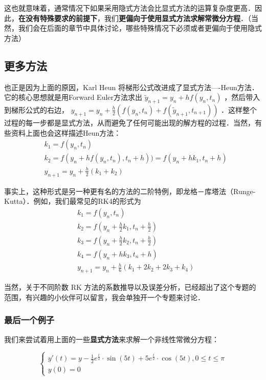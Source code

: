 这也就意味着，通常情况下如果采用隐式方法会比显式方法的运算复杂度更高．因此，\textbf{在没有特殊要求的前提下}，我们\textbf{更偏向于使用显式方法求解常微分方程}．（当然，我们会在后面的章节中具体讨论，哪些特殊情况下必须或者更偏向于使用隐式方法）

\subsection{更多方法}

也正是因为上面的原因，Karl Heun 将梯形公式改进成了显式方法----Heun方法．它的核心思想就是用Forward Euler方法求出  $\tilde{y}_{n+1}=y_n+hf(y_n,t_n)$ ，然后带入到梯形公式的右边，  $y_{n+1}=y_n+\frac{h}{2}\left(f(y_n,t_n)+f(\tilde{y}_{n+1},t_{n+1}) \right)$ ．这样整个过程的每一步都是显式方法，从而避免了任何可能出现的解方程的过程．当然，有些资料上面也会这样描述Heun方法：
\begin{equation}
\begin{aligned}
&k_1=f(y_n,t_n)\\
&k_2=f(y_n+hf(y_n,t_n),t_n+h))=f(y_n+hk_1,t_n+h)\\
&y_{n+1}=y_n+\frac{h}{2}(k_1+k_2)
\end{aligned}
\end{equation}

事实上，这种形式是另一种更有名的方法的二阶特例，即龙格－库塔法（Runge-Kutta）．例如，我们最常见的RK4的形式为
\begin{equation}
\begin{aligned}
&k_1=f(y_n,t_n)\\
&k_2=f\left(y_n+\frac{h}{2}k_1, t_n+\frac{h}{2}\right)\\
&k_3=f\left(y_n+\frac{h}{2}k_2, t_n+\frac{h}{2}\right)\\
&k_4=f\left(y_n+hk_3, t_n+h\right)\\
&y_{n+1}=y_{n}+\frac{h}{6}(k_1+2k_2+2k_3+k_4)
\end{aligned}
\end{equation}

当然，关于不同阶数 RK 方法的系数推导以及误差分析，已经超出了这个专题的范围，有兴趣的小伙伴可以留言，我会单独开一个专题来讨论．

\subsubsection{最后一个例子}

我们来尝试着用上面的一些\textbf{显式方法}来求解一个非线性常微分方程：

\begin{equation}
\begin{cases}
 y'(t) = y-\frac{1}{2}e^{\frac{t}{2}}\cdot\sin(5t)+5e^{\frac{t}{2}}\cdot\cos(5t), 0\le t\le \pi\\     y(0)=0
\end{cases}
\end{equation}

